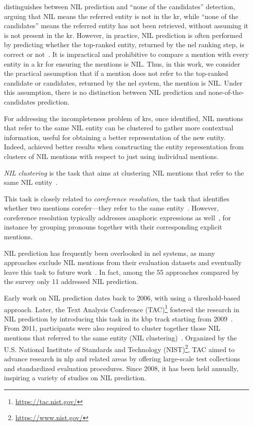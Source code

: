 \textcite{zhou-etal-2024-gendecider} distinguishes between NIL prediction and ``none of the candidates'' detection, arguing that NIL means the referred entity is not in the \ac{kr}, while ``none of the candidates'' means the referred entity has not been retrieved, without assuming it is not present in the \ac{kr}. However, in practice, NIL prediction is often performed by predicting whether the top-ranked entity, returned by the \ac{nel} ranking step, is correct or not~\cite{entity_linking_with_kb_2015}. It is impractical and prohibitive to compare a mention with every entity in a \ac{kr} for ensuring the mentions is NIL. Thus, in this work, we consider the practical assumption that if a mention does not refer to the top-ranked candidate or candidates, returned by the \ac{nel} system, the mention is NIL. Under this assumption, there is no distinction between NIL prediction and none-of-the-candidates prediction.

For addressing the incompleteness problem of \acp{kr}, once identified, NIL mentions that refer to the same NIL entity can be clustered to gather more contextual information, useful for obtaining a better representation of the new entity. Indeed, \textcite{kassner-etal-2022-edin} achieved better results when constructing the entity representation from clusters of NIL mentions with respect to just using individual mentions.

\begin{definition}
    \emph{NIL clustering} is the task that aims at clustering NIL mentions that refer to the same NIL entity~\cite{ji2011tac}.
\end{definition}
This task is closely related to \emph{coreference resolution}, the task that identifies whether two mentions corefer---\ie they refer to the same entity~\cite{jm3}. However, coreference resolution typically addresses anaphoric expressions as well~\cite{jm3}, for instance by grouping pronouns together with their corresponding explicit mentions.

NIL prediction has frequently been overlooked in \ac{nel}
systems, as many approaches exclude NIL mentions from their evaluation datasets and
eventually leave this task to future work~\cite{blink}. In fact, among the 55 approaches
compared by the survey \textcite{Sevgili2022NeuralEL} only 11 addressed NIL prediction. 

Early work on NIL prediction dates back to 2006, with \textcite{bunescu-pasca-2006-using} using a threshold-based approach.
Later, the Text Analysis Conference (TAC)\footnote{\url{https://tac.nist.gov/}} fostered the research in NIL prediction by introducing this task in its \acf{kbp} track starting from 2009~\cite{mcnamee2009overview}. From 2011, participants were also required to cluster together those NIL mentions that referred to the same entity (NIL clustering)~\cite{ji2011tac}. Organized by the U.S. National Institute of Standards and Technology (NIST)\footnote{\url{https://www.nist.gov/}}, TAC aimed to advance research in \ac{nlp} and related areas by offering large-scale test collections and standardized evaluation procedures. Since 2008, it has been held annually, inspiring a variety of studies on NIL prediction.

